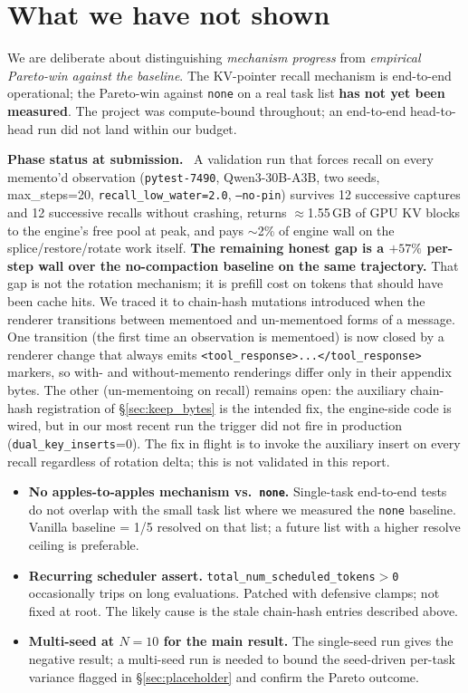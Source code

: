 \documentclass[letterpaper,twocolumn,10pt]{article}
\newcommand{\para}[1]{\smallskip\noindent\textbf{#1.}\ }
\begin{document}
\section{What we have not shown}
\label{sec:status}

We are deliberate about distinguishing \emph{mechanism progress}
from \emph{empirical Pareto-win against the baseline}. The
KV-pointer recall mechanism is end-to-end operational; the
Pareto-win against \texttt{none} on a real task list
\textbf{has not yet been measured}. The project was compute-bound
throughout; an end-to-end head-to-head run did not land within
our budget.

\para{Phase status at submission} A validation run that forces
recall on every memento'd observation
(\texttt{pytest-7490}, Qwen3-30B-A3B, two seeds, max\_steps=20,
\texttt{recall\_low\_water=2.0}, \texttt{--no-pin}) survives 12
successive captures and 12 successive recalls without crashing,
returns $\approx$1.55\,GB of GPU KV blocks to the engine's free
pool at peak, and pays $\sim$2\% of engine wall on the
splice/restore/rotate work itself. \textbf{The remaining honest
gap is a $+57\%$ per-step wall over the no-compaction baseline on
the same trajectory.} That gap is not the rotation mechanism; it
is prefill cost on tokens that should have been cache hits. We
traced it to chain-hash mutations introduced when the renderer
transitions between mementoed and un-mementoed forms of a
message. One transition (the first time an observation is
mementoed) is now closed by a renderer change that always emits
\texttt{<tool\_response>...</tool\_response>} markers, so with-
and without-memento renderings differ only in their appendix
bytes. The other (un-mementoing on recall) remains open: the
auxiliary chain-hash registration of \S\ref{sec:keep_bytes} is
the intended fix, the engine-side code is wired, but in our most
recent run the trigger did not fire in production
(\texttt{dual\_key\_inserts}=0). The fix in flight is to invoke
the auxiliary insert on every recall regardless of rotation
delta; this is not validated in this report.

\begin{itemize}[itemsep=2pt,topsep=2pt]
\item \textbf{No apples-to-apples mechanism vs.~\texttt{none}.}
Single-task end-to-end tests do not overlap with the small task
list where we measured the \texttt{none} baseline. Vanilla
baseline = 1/5 resolved on that list; a future list with a higher
resolve ceiling is preferable.
\item \textbf{Recurring scheduler assert.}
\texttt{total\_num\_scheduled\_tokens$>$0} occasionally trips on
long evaluations. Patched with defensive clamps; not fixed at root.
The likely cause is the stale chain-hash entries described above.
\item \textbf{Multi-seed at $N{=}10$ for the main result.} The
single-seed run gives the negative result; a multi-seed run is
needed to bound the seed-driven per-task variance flagged in
\S\ref{sec:placeholder} and confirm the Pareto outcome.
\end{itemize}
\end{document}
